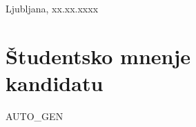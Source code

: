 \documentclass[a4paper,12pt]{article}
\begin{document}
\thispagestyle{prvastran}

\vspace*{2cm}
\hfill Ljubljana, xx.xx.xxxx
\vspace{1cm}

\section*{Študentsko mnenje\\ kandidatu}
\vspace{0.5cm}

{AUTO_GEN}

\vspace{2cm}
\end{document}
